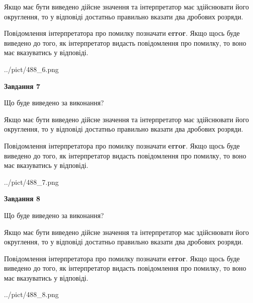 \documentclass[12pt, ukrainian]{article}
\begin{document}
{\begin {Large}
Якщо має бути виведено дійсне значення та інтерпретатор має здійснювати його округлення, 
то у відповіді достатньо правильно вказати два дробових розряди.

Повідомлення інтерпретатора про помилку позначати \textbf{error}.
Якщо щось буде виведено до того, як інтерпретатор видасть повідомлення про помилку, 
то воно має вказуватись у відповіді. \par

\begin{center}
	{../pict/488_6.png}
\end{center}
\newpage

{\begin {center}\textbf{Завдання 7}\end {center}}\par
Що буде виведено за виконання? \par

Якщо має бути виведено дійсне значення та інтерпретатор має здійснювати його округлення, 
то у відповіді достатньо правильно вказати два дробових розряди.

Повідомлення інтерпретатора про помилку позначати \textbf{error}.
Якщо щось буде виведено до того, як інтерпретатор видасть повідомлення про помилку, 
то воно має вказуватись у відповіді. \par

\begin{center}
	{../pict/488_7.png}
\end{center}
\newpage

{\begin {center}\textbf{Завдання 8}\end {center}}\par
Що буде виведено за виконання? \par

Якщо має бути виведено дійсне значення та інтерпретатор має здійснювати його округлення, 
то у відповіді достатньо правильно вказати два дробових розряди.

Повідомлення інтерпретатора про помилку позначати \textbf{error}.
Якщо щось буде виведено до того, як інтерпретатор видасть повідомлення про помилку, 
то воно має вказуватись у відповіді. \par

\begin{center}
	{../pict/488_8.png}
\end{center}
\newpage


\end{Large}}
\end{document}
